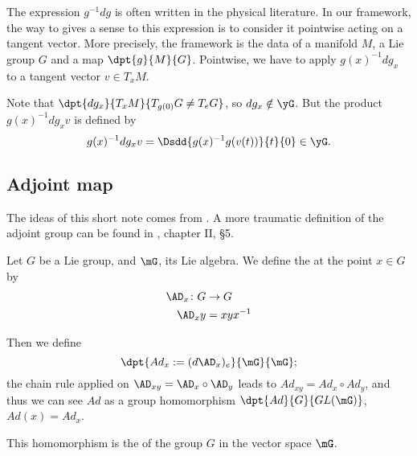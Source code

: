 The expression $g^{-1} dg$ is often written in the physical literature. In our framework, the way to gives a sense to this expression is to consider it pointwise acting on a tangent vector. More precisely, the framework is the data of a manifold $M$, a Lie group $G$ and a map $\dpt{g}{M}{G}$. Pointwise, we have to apply $g(x)^{-1} dg_x$ to a tangent vector $v\in T_xM$.

Note that $\dpt{dg_x}{T_xM}{T_{g(0)}G\neq T_eG}$, so $dg_x\notin \yG$. But the product $g(x)^{-1} dg_x v$ is defined by
\begin{equation}
	g(x)^{-1} dg_x v=\Dsdd{ g(x)^{-1} g(v(t)) }{t}{0}\in\yG.
\end{equation}


\subsection{Adjoint map}

The ideas of this short note comes from \cite{Lie}. A more traumatic definition of the adjoint group can be found in \cite{Helgason}, chapter II, \S 5. 

\begin{definition}
    Let $G$ be a Lie group, and $\mG$, its Lie algebra. We define the  at the point $x\in G$ by
    \begin{equation}
        \begin{aligned}
            \AD_x\colon G&\to G \\
            \AD_xy&=xyx^{-1}
        \end{aligned}
    \end{equation}
\end{definition}

Then we define
\[
\dpt{Ad_x:=(d\AD_x)_e}{\mG}{\mG};
\]
the chain rule applied on $\AD_{xy}=\AD_x\circ\AD_y$ leads to $Ad_{xy}=Ad_x\circ Ad_y$, and thus we can see $Ad$ as a group homomorphism $\dpt{Ad}{G}{GL(\mG)}$, $Ad(x)=Ad_x$.

\begin{definition}
This homomorphism is the  of the group $G$ in the vector space $\mG$.
\end{definition}


